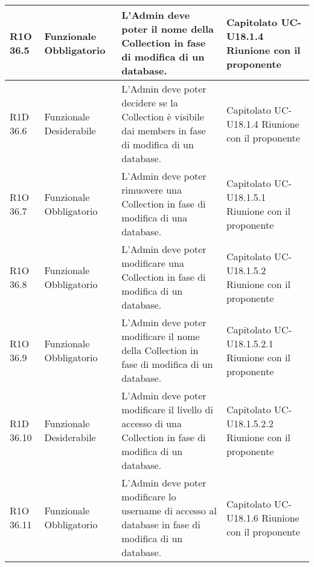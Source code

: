 \begin{center}
\begin{longtable}{ | l | p{2cm} | p{4.7cm} | p{2.5cm} |}
	R1O 36.5 & Funzionale \newline Obbligatorio & L'Admin deve poter il nome della Collection in fase di modifica di un database. & Capitolato \newline UC-U18.1.4 \newline Riunione con il proponente \\ \hline
	
	R1D 36.6 & Funzionale \newline Desiderabile & L'Admin deve poter decidere se la Collection è visibile dai members in fase di modifica di un database. & Capitolato \newline UC-U18.1.4 \newline Riunione con il proponente \\ \hline
	
	R1O 36.7 & Funzionale \newline Obbligatorio & L'Admin deve poter rimuovere una Collection in fase di modifica di una database. & Capitolato \newline UC-U18.1.5.1 \newline Riunione con il proponente \\ \hline
	
	R1O 36.8 & Funzionale \newline Obbligatorio & L'Admin deve poter modificare una Collection in fase di modifica di un database. & Capitolato \newline UC-U18.1.5.2 \newline Riunione con il proponente \\ \hline
	
	R1O 36.9 & Funzionale \newline Obbligatorio & L'Admin deve poter modificare il nome della Collection in fase di modifica di un database. & Capitolato \newline UC-U18.1.5.2.1 \newline Riunione con il proponente \\ \hline
	
	R1D 36.10 & Funzionale \newline Desiderabile & L'Admin deve poter modificare il livello di accesso di una Collection in fase di modifica di un database. & Capitolato \newline UC-U18.1.5.2.2 \newline Riunione con il proponente \\ \hline
	
	R1O 36.11 & Funzionale \newline Obbligatorio & L'Admin deve poter modificare lo username di accesso al database in fase di modifica di un database. & Capitolato \newline UC-U18.1.6 \newline Riunione con il proponente \\ \hline
	

\end{longtable}
\end{center}
